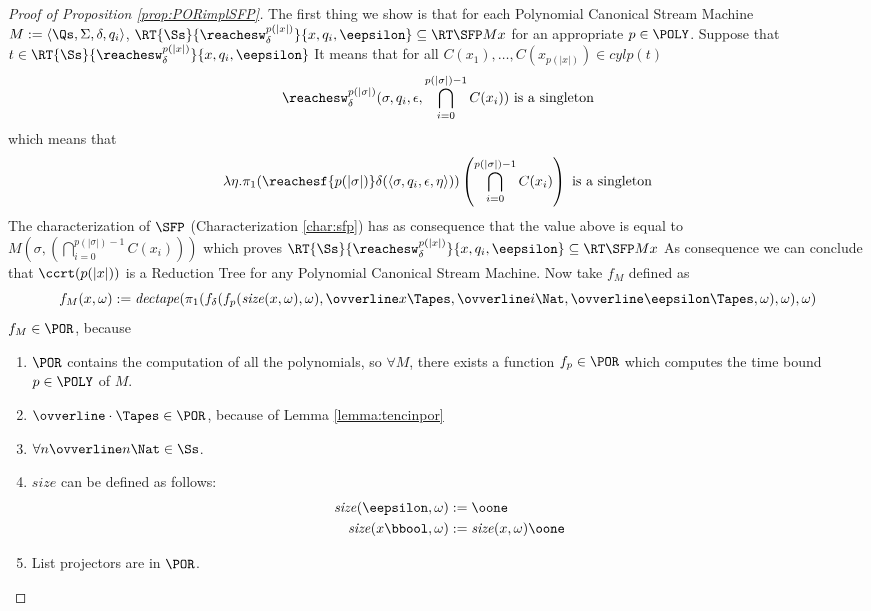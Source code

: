 \begin{conditional}{\notappendix}
    \begin{proof}[Proof of Proposition \ref{prop:PORimplSFP}]
      The first thing we show is that for each Polynomial Canonical Stream
      Machine $M:=\langle \Qs,\Sigma, \delta, q_i\rangle$,
      $\RT{\Ss} {\reachesw^{p(|x|)}_\delta}
      {x, q_i, \eepsilon}\subseteq \RT \SFP M x$
       for
      an appropriate $p \in \POLY$.
      Suppose that $t \in \RT{\Ss} {\reachesw^{p(|x|)}_\delta} {x, q_i, \eepsilon}$
      It means that for all $C(x_1), \ldots, C(x_{p(|x|)})\in \mathit{cylp}(t)$
      \[
      \reachesw^{p(|\sigma|)}_\delta(\sigma,q_i, \epsilon,\bigcap_{i=0}^{p(|\sigma|)-1} C(x_i)) \text{ is a singleton}
      \]
      which means that
      \[
      \lambda \eta. \pi_1(\reachesf {p(|\sigma|)} \delta(\langle \sigma,q_i, \epsilon,\eta\rangle))\left(\bigcap_{i=0}^{p(|\sigma|)-1} C(x_i)\right)\text{ is a singleton}
      \]
      The characterization of $\SFP$ (Characterization \ref{char:sfp})
      has as consequence that the value above is equal to $M(\sigma, \left(\bigcap_{i=0}^{p(|\sigma|)-1} C(x_i)\right))$ which proves
      $\RT{\Ss} {\reachesw^{p(|x|)}_\delta} {x, q_i, \eepsilon}\subseteq \RT \SFP M x$
      As consequence we can conclude that $\ccrt(p(|x|))$ is a Reduction Tree for any
      Polynomial Canonical Stream Machine.
      Now take $f_M$ defined as
      \[
        f_M(x, \omega) := \mathit{dectape}(\pi_1(f_\delta(f_p(\mathit{size}(x, \omega),\omega),
        \ovverline x\Tapes, \ovverline i \Nat,
        \ovverline \eepsilon\Tapes, \omega), \omega), \omega)
      \]
      $f_M \in \POR$, because
      \begin{enumerate}
        \item $\POR$ contains the computation of all the polynomials,
        so $\forall M$, there exists a function $f_p\in \POR$ which computes
        the time bound $p\in \POLY$ of $M$.
        \item $\ovverline \cdot \Tapes\in \POR$, because of Lemma
        \ref{lemma:tencinpor}
        \item $\forall n \ovverline n \Nat\in \Ss$.
        \item $\mathit{size}$ can be defined as follows:
        \begin{align*}
        \mathit{size}(\eepsilon, \omega) &:= \oone\\
        \mathit{size}(x\bbool, \omega) &:= \mathit{size}(x, \omega)\oone
      \end{align*}
        \item List projectors are in $\POR$.

\end{enumerate}
\end{proof}
\end{conditional}
